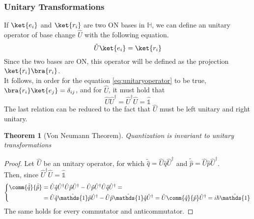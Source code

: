 \documentclass[a4paper, 11pt]{book}
\newcommand{\1}{\opr{\mathds{1}}}
\newcommand{\opr}[1]{\hat{#1}}
\newcommand{\adj}[2][]{#2^{\dagger#1}}
\newtheorem{thm}{Theorem}
\theoremstyle{plain}
\begin{document}
	\subsubsection{Unitary Transformations}
	If $\ket{e_i}$ and $\ket{r_i}$ are two ON bases in $\mathbb{H}$, we can define an unitary operator of base change $\opr{U}$ with the following equation.\\
	\begin{equation}
		\opr{U}\ket{e_i}=\ket{r_i}
		\label{eq:unitaryoperator}
	\end{equation}
	Since the two bases are ON, this operator will be defined as the projection $\ket{r_i}\bra{r_i}$.\\
	It follows, in order for the equation \eqref{eq:unitaryoperator} to be true, $\bra{r_i}\ket{e_j}=\delta_{ij}$, and for $\opr{U}$, it must hold that
	\begin{equation}
		\opr{U}\adj{\opr{U}}=\adj{\opr{U}}\opr{U}=\1
		\label{eq:leftrightunitariety}
	\end{equation}
	The last relation can be reduced to the fact that $\opr{U}$ must be left unitary and right unitary.
	\begin{thm}[Von Neumann Theorem]
		Quantization is invariant to unitary transformations
	\end{thm}
	\begin{proof}
		Let $\opr{U}$ be an unitary operator, for which $\tilde{\opr{q}}=\opr{U}\opr{q}\adj{\opr{U}}$ and $\tilde{\opr{p}}=\opr{U}\opr{p}\adj{\opr{U}}$.\\
		Then, since $\adj{\opr{U}}\opr{U}=\1$
		\begin{equation}
			\left\{ \begin{aligned}
					\comm{\tilde{\opr{q}}}{\tilde{\opr{p}}}&=\opr{U}\opr{q}\adj{\opr{U}}\opr{U}\opr{p}\adj{\opr{U}}-\opr{U}\opr{p}\adj{\opr{U}}\opr{U}\opr{q}\adj{\opr{U}}=\\
					&=\opr{U}\opr{q}\1\opr{p}\adj{\opr{U}}-\opr{U}\opr{p}\1\opr{q}\adj{\opr{U}}=\opr{U}\comm{\opr{q}}{\opr{p}}\adj{\opr{U}}=i\hbar\1
			\end{aligned}\right.
			\label{eq:unitarytranscons}
		\end{equation}
		The same holds for every commutator and anticommutator.
	\end{proof}
\end{document}
